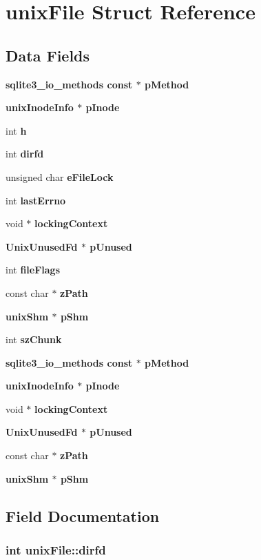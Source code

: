\section{unix\-File Struct Reference}
\label{structunixFile}
\subsection*{Data Fields}
\begin{CompactItemize}
\item 
\bf{sqlite3\_\-io\_\-methods} const $\ast$ \bf{p\-Method}
\item 
\bf{unix\-Inode\-Info} $\ast$ \bf{p\-Inode}
\item 
int \bf{h}
\item 
int \bf{dirfd}
\item 
unsigned char \bf{e\-File\-Lock}
\item 
int \bf{last\-Errno}
\item 
void $\ast$ \bf{locking\-Context}
\item 
\bf{Unix\-Unused\-Fd} $\ast$ \bf{p\-Unused}
\item 
int \bf{file\-Flags}
\item 
const char $\ast$ \bf{z\-Path}
\item 
\bf{unix\-Shm} $\ast$ \bf{p\-Shm}
\item 
int \bf{sz\-Chunk}
\item 
\bf{sqlite3\_\-io\_\-methods} const $\ast$ \bf{p\-Method}
\item 
\bf{unix\-Inode\-Info} $\ast$ \bf{p\-Inode}
\item 
void $\ast$ \bf{locking\-Context}
\item 
\bf{Unix\-Unused\-Fd} $\ast$ \bf{p\-Unused}
\item 
const char $\ast$ \bf{z\-Path}
\item 
\bf{unix\-Shm} $\ast$ \bf{p\-Shm}
\end{CompactItemize}


\subsection{Field Documentation}
\subsubsection{\setlength{\rightskip}{0pt plus 5cm}int \bf{unix\-File::dirfd}}\label{structunixFile_52816496ea85014f100930c1a0edef3d}


